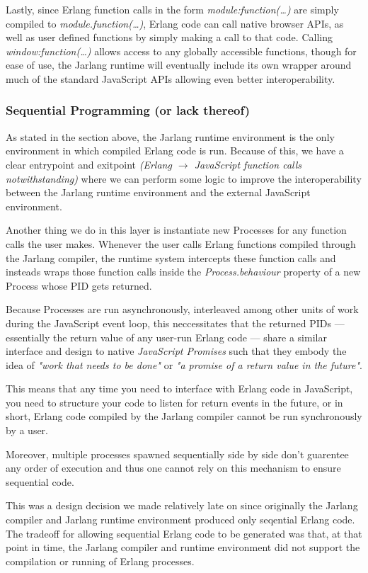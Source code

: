 \documentclass[twoside,12pt,titlepage,a4paper]{article}
\begin{document}
Lastly, since Erlang function calls in the form \textit{module:function(\dots)} are simply compiled to \textit{module.function(\dots)}, Erlang code can call native browser APIs, as well as user defined functions by simply making a call to that code. Calling \textit{window:function(\dots)} allows access to any globally accessible functions, though for ease of use, the Jarlang runtime will eventually include its own wrapper around much of the standard JavaScript APIs allowing even better interoperability.

\subsubsection{Sequential Programming (or lack thereof)}
As stated in the section above, the Jarlang runtime environment is the only environment in which compiled Erlang code is run. Because of this, we have a clear entrypoint and exitpoint \textit{(Erlang $\rightarrow$ JavaScript function calls notwithstanding)} where we can perform some logic to improve the interoperability between the Jarlang runtime environment and the external JavaScript environment.

Another thing we do in this layer is instantiate new Processes for any function calls the user makes. Whenever the user calls Erlang functions compiled through the Jarlang compiler, the runtime system intercepts these function calls and insteads wraps those function calls inside the \textit{Process.behaviour} property of a new Process whose PID gets returned.

Because Processes are run asynchronously, interleaved among other units of work during the JavaScript event loop, this neccessitates that the returned PIDs --- essentially the return value of any user-run Erlang code --- share a similar interface and design to native \textit{JavaScript Promises} such that they embody the idea of \textit{"work that needs to be done"} or \textit{"a promise of a return value in the future"}.

This means that any time you need to interface with Erlang code in JavaScript, you need to structure your code to listen for return events in the future, or in short, Erlang code compiled by the Jarlang compiler cannot be run synchronously by a user.

Moreover, multiple processes spawned sequentially side by side don't guarentee any order of execution and thus one cannot rely on this mechanism to ensure sequential code.

This was a design decision we made relatively late on since originally the Jarlang compiler and Jarlang runtime environment produced only seqential Erlang code. The tradeoff for allowing sequential Erlang code to be generated was that, at that point in time, the Jarlang compiler and runtime environment did not support the compilation or running of Erlang processes.
\end{document}
